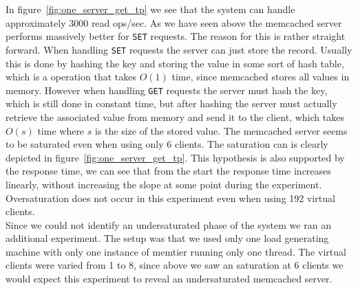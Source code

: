 \documentclass[11pt,a4paper]{article}
\begin{document}
%
In figure~\ref{fig:one_server_get_tp} we see that the system can handle approximately 3000 read ops/sec.
%
As we have seen above the memcached server performs massively better for \texttt{SET} requests.
%
The reason for this is rather straight forward.
%
When handling \texttt{SET} requests the server can just store the record.
%
Usually this is done by hashing the key and storing the value in some sort of hash table, which is a operation that takes $O(1)$ time, since memcached stores all values in memory.
%
However when handling \texttt{GET} requests the server must hash the key, which is still done in constant time, but after hashing the server must actually retrieve the associated value from memory and send it to the client, which takes $O(s)$ time where $s$ is the size of the stored value.
%
The memcached server seems to be saturated even when using only 6 clients.
%
The saturation can is clearly depicted in figure~\ref{fig:one_server_get_tp}.
%
This hypothesis is also supported by the response time, we can see that from the start the response time increases linearly, without increasing the slope at some point during the experiment.
%
Oversaturation does not occur in this experiment even when using 192 virtual clients.
%
\\
%
Since we could not identify an undersaturated phase of the system we ran an additional experiment.
%
The setup was that we used only one load generating machine with only one instance of memtier running only one thread.
%
The virtual clients were varied from 1 to 8, since above we saw an saturation at 6 clients we would expect this experiment to reveal an undersaturated memcached server.
%
\end{document}
